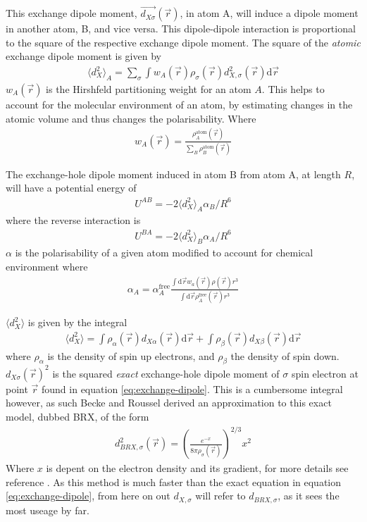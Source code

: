 \documentclass[10pt,a4paper,twocolumn,twoside]{extarticle}
\renewcommand{\d}{\text{d}}
\begin{document}
	This exchange dipole moment, $\vec{d_{X\sigma}}(\vec{r})$, in atom A, will induce a dipole moment in another atom, B, and vice versa. This dipole-dipole interaction is proportional to the square of the respective exchange dipole moment. The square of the \emph{atomic} exchange dipole moment is given by
	\begin{align}
		\langle d_{X}^2 \rangle_A = \sum_\sigma \int  w_A(\vec{r}) \rho_\sigma(\vec{r}) d_{X,\sigma}^2(\vec{r}) \d\vec{r}
	\end{align}
	$w_A(\vec{r})$ is the Hirshfeld partitioning\cite{Hirshfeld} weight for an atom $A$. This helps to account for the molecular environment of an atom, by estimating changes in the atomic volume and thus changes the polarisability. 
	Where 
	\begin{align}
		w_A(\vec{r}) = \frac{\rho_A^\text{atom}(\vec{r})}{\sum_B\rho_B^\text{atom}(\vec{r})}
	\end{align}

	The exchange-hole dipole moment induced in atom B from atom A, at length $R$, will have a potential energy of 
	\begin{align}
		U^{AB} = -2\langle d_X^2 \rangle_A \alpha_B / R^6
	\end{align} 
	where the reverse interaction is  
	\begin{align}
		U^{BA} = -2\langle d_X^2 \rangle_B \alpha_A / R^6
	\end{align} 
	$\alpha$ is the polarisability of a given atom modified to account for chemical environment where
	\begin{align}
		\alpha_A = \alpha_A^\text{free} \frac{\int\d\vec{r} w_a(\vec{r})\rho(\vec{r})r^3}{\int \d\vec{r}\rho_A^\text{free}(\vec{r})r^3}
	\end{align}
	
	
	$\langle d_X^2 \rangle$ is given by the integral
	\begin{align}
		\langle d_X^2 \rangle = \int \rho_\alpha(\vec{r}) d_{X\alpha}(\vec{r}) \d \vec{r} +
								\int \rho_\beta(\vec{r}) d_{X\beta}(\vec{r}) \d \vec{r}
	\end{align}
	where $\rho_\alpha$ is the density of spin up electrons, and $\rho_\beta$ the density of spin down. $d_{X\sigma}(\vec{r})^2$ is the squared \emph{exact} exchange-hole dipole moment of $\sigma$ spin electron at point $\vec{r}$ found in equation \ref{eq:exchange-dipole}. This is a cumbersome integral however, as such Becke and Roussel derived an approximation to this exact model, dubbed BRX, of the form
	\begin{align}
		d_{BRX,\sigma}^2(\vec{r}) = \left(\frac{e^{-x}}{8\pi\rho_\sigma(\vec{r})}\right)^{2/3}x^2
	\end{align} 
	Where $x$ is depent on the electron density and its gradient, for more details see reference \cite{XDM-Original}. As this method is much faster than the exact equation in equation \ref{eq:exchange-dipole}, from here on out $d_{X,\sigma}$ will refer to $d_{BRX,\sigma}$, as it sees the most useage by far. 
\end{document}
